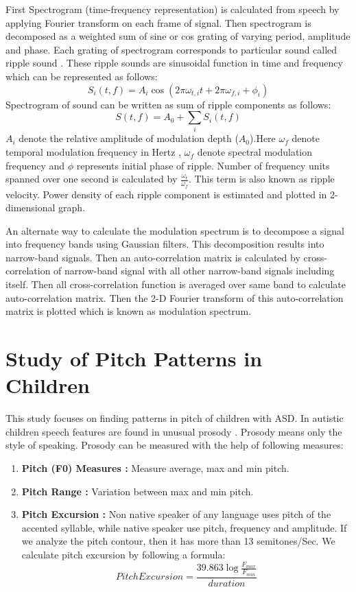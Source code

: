 \documentclass[11pt]{report}
\begin{document}
First Spectrogram (time-frequency representation) is calculated from speech by applying Fourier transform on each frame of signal. Then spectrogram is decomposed as a weighted sum of sine or cos grating of varying period, amplitude and phase. Each grating of spectrogram corresponds to particular sound  called ripple sound \cite{acoustic}. These ripple sounds are sinusoidal function in time and frequency which can be represented as follows:
\begin{equation}
S_i(t,f)=A_i \cos(2\pi\omega_{t,i}t + 2\pi \omega_{f,i} +\phi_i)
\end{equation} 
Spectrogram of sound can be written as sum of ripple components as follows:
\begin{equation}
S(t,f)=A_0 +\sum\limits_i S_i(t,f)
\end{equation}
$A_i$ denote the relative amplitude of modulation depth ($A_0$).Here $\omega_f$ denote temporal modulation frequency in Hertz ,  $\omega_f$ denote spectral modulation frequency and $\phi$ represents initial phase of ripple. Number of frequency units spanned over one second is calculated by $\frac{\omega_t}{\omega_f}$. This term is also known as ripple velocity. Power density of each ripple component is estimated  and plotted in 2-dimensional graph.


An alternate way to calculate the modulation spectrum is to decompose a signal into frequency bands using Gaussian filters. This decomposition results into narrow-band signals. Then an auto-correlation matrix is calculated by cross-correlation of narrow-band signal with all other narrow-band signals including itself. Then all cross-correlation function is averaged over same band to calculate auto-correlation matrix. Then the 2-D Fourier transform of this auto-correlation matrix is plotted which is known as modulation spectrum.

\section{Study of Pitch Patterns in Children}
This study focuses on finding patterns in pitch of children with ASD. In autistic children speech features are found in unusual prosody \cite{melody}. Prosody means only the style of speaking. Prosody can be measured with the help of following measures:
\begin{enumerate}
\item \textbf{Pitch (F0) Measures :} Measure average, max and min pitch.
\item \textbf{Pitch Range :} Variation between max and min pitch.
\item \textbf{Pitch Excursion :} Non native speaker of any language uses pitch of the accented syllable, while native speaker use pitch, frequency and amplitude. If we analyze the pitch contour, then it has more than 13 semitones/Sec. We calculate pitch excursion by following a formula: 
\begin{equation}
Pitch Excursion= \frac{39.863 \log{\frac{F_{max}}{F_{min}}}}{duration}
\end{equation} 
\end{enumerate}
\end{document}
